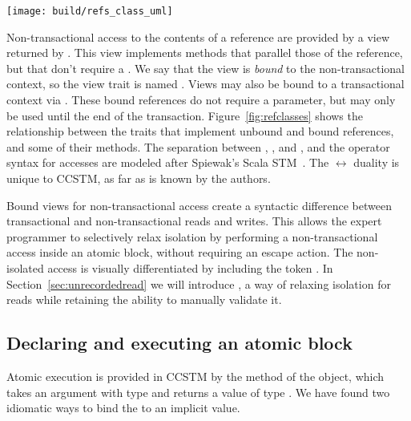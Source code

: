 \begin{figure*}
  \centering
  \texttt{[image: build/refs\_class\_uml]}

\caption{Traits that provide access to an STM-managed memory
location.  Transactional access can occur through either 
or a  returned from ,
non-transactional access occurs through a  returned
from .   and 
decompose the covariant and contravariant operations of .}

\label{fig:refclasses}
\end{figure*}


Non-transactional access to the contents of a reference are provided by a view
returned by .  This view implements methods that parallel those of
the reference, but that don't require a .  We say that the view
is \textit{bound} to the non-transactional context, so the view trait is
named .  Views may also be bound to a transactional context
via .  These bound references do not require a 
parameter, but may only be used until the end of the transaction.
Figure~\ref{fig:refclasses} shows the
 relationship between the traits that implement unbound
and bound references, and some of their methods.  The separation between
, , and , and the operator syntax for
accesses are modeled after Spiewak's Scala STM~\cite{github:spiewak}.
The  $ \leftrightarrow $  duality is unique
to CCSTM, as far as is known by the authors.

Bound views for non-transactional access create a syntactic difference
between transactional and non-transactional reads and writes.
This allows the expert programmer to selectively relax isolation by
performing a non-transactional access inside an atomic block, without
requiring an escape action.  The non-isolated access
is visually differentiated by including the token .  In
Section~\ref{sec:unrecordedread} we will introduce ,
a way of relaxing isolation for reads while retaining the ability to
manually validate it.

\subsection{Declaring and executing an atomic block}

Atomic execution is provided in CCSTM by the  method of
the  object, which takes an argument with type
 and returns a value of type .
We have found two idiomatic ways to bind the  to an implicit
value.

